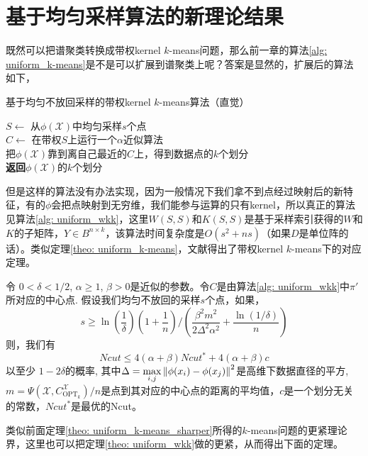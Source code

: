 \section{基于均匀采样算法的新理论结果}
既然可以把谱聚类转换成带权kernel $k$-means问题，那么前一章的算法\ref{alg: uniform_k-means}是不是可以扩展到谱聚类上呢？答案是显然的，扩展后的算法如下，
\begin{algorithm}
    \caption{基于均匀不放回采样的带权kernel $k$-means算法（直觉）}
    $S \gets$ 从$\phi(\mathcal{X})$中均匀采样$s$个点\\
    $C \gets$ 在带权$S$上运行一个$\alpha$近似算法\\
    把$\phi(\mathcal{X})$靠到离自己最近的$C$上，得到数据点的$k$个划分\\
    \textbf{返回}$\phi(\mathcal{X})$的$k$个划分
\end{algorithm}
但是这样的算法没有办法实现，因为一般情况下我们拿不到点经过映射后的新特征，有的$\phi$会把点映射到无穷维，我们能参与运算的只有kernel，所以真正的算法见算法\ref{alg: uniform_wkk}，这里$W(S,S)$和$K(S,S)$是基于采样索引获得的$W$和$K$的子矩阵，$Y\in B^{n\times k}$，该算法时间复杂度是$O(s^2+ns)$（如果$D$是单位阵的话）。类似定理\ref{theo: uniform_k-means}，文献\cite{Mohan:2017:BNA:3172077.3172235}得出了带权kernel $k$-means下的对应定理。
\begin{theorem}[均匀不放回采样的谱聚类解的质量]
    \label{theo: uniform_wkk}
    令 $0 < \delta <1/2$, $\alpha \geq 1$, $\beta >0$是近似的参数。令$C$是由算法\ref{alg: uniform_wkk}中$\pi'$所对应的中心点. 假设我们均匀不放回的采样$s$个点，如果，
    \begin{equation}
    s \geq \ln(\frac{1}{\delta})(1+\frac{1}{n})/(\frac{\beta^2 m^2}{2\Delta^2 \alpha^2}+\frac{\ln(1/\delta)}{n})
    \end{equation}
    则，我们有
    \begin{equation}
    Ncut \leq 4(\alpha + \beta) Ncut^* + 4(\alpha + \beta)c
    \end{equation}
    以至少 $1-2\delta$的概率, 其中$\Delta = \max\limits_{i,j}\left\lVert\phi(x_i) - \phi(x_j)\right\rVert^2$是高维下数据直径的平方, $m = \Psi(\mathcal{X},C_{\text{OPT}_k}^{\mathcal{X}})/n$是点到其对应的中心点的距离的平均值，$c$是一个划分无关的常数，$Ncut^*$是最优的Ncut。
\end{theorem}
类似前面定理\ref{theo: uniform_k-means_sharper}所得的$k$-means问题的更紧理论界，这里也可以把定理\ref{theo: uniform_wkk}做的更紧，从而得出下面的定理。
